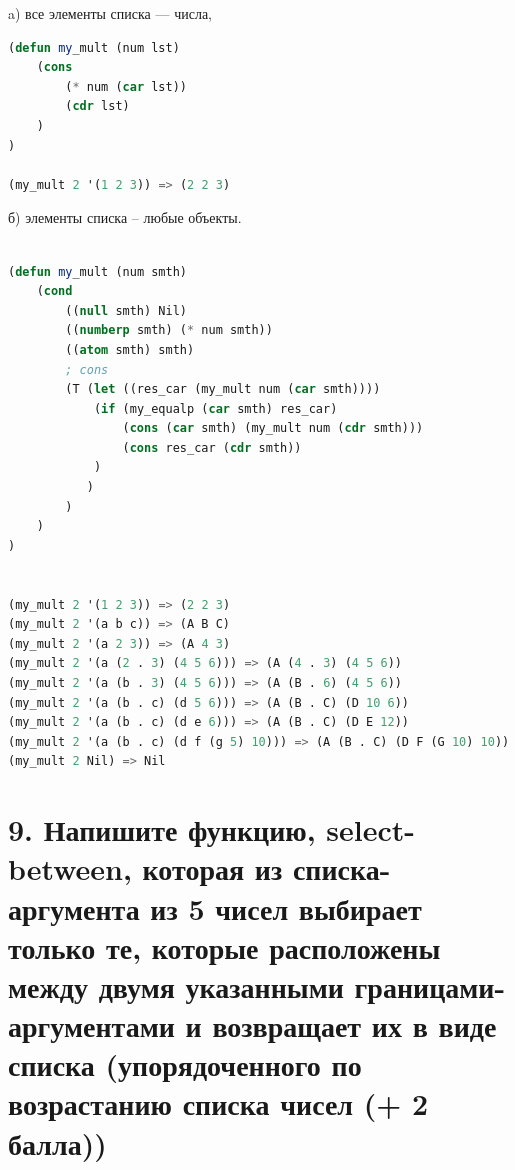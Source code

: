 \documentclass[12pt]{report}
\begin{document}
a) все элементы списка --- числа,

\begin{lstlisting}[language=Lisp]
(defun my_mult (num lst) 
	(cons 
		(* num (car lst)) 
		(cdr lst)
	)
)

(my_mult 2 '(1 2 3)) => (2 2 3)
\end{lstlisting}


б) элементы списка -- любые объекты.

\begin{lstlisting}[language=Lisp]

(defun my_mult (num smth)
	(cond 
		((null smth) Nil)
		((numberp smth) (* num smth))
		((atom smth) smth)
		; cons
		(T (let ((res_car (my_mult num (car smth))))
			(if (my_equalp (car smth) res_car)
				(cons (car smth) (my_mult num (cdr smth)))
				(cons res_car (cdr smth))
			)
		   )
		)
	)
)


(my_mult 2 '(1 2 3)) => (2 2 3)
(my_mult 2 '(a b c)) => (A B C)
(my_mult 2 '(a 2 3)) => (A 4 3)
(my_mult 2 '(a (2 . 3) (4 5 6))) => (A (4 . 3) (4 5 6))
(my_mult 2 '(a (b . 3) (4 5 6))) => (A (B . 6) (4 5 6))
(my_mult 2 '(a (b . c) (d 5 6))) => (A (B . C) (D 10 6))
(my_mult 2 '(a (b . c) (d e 6))) => (A (B . C) (D E 12))
(my_mult 2 '(a (b . c) (d f (g 5) 10))) => (A (B . C) (D F (G 10) 10))
(my_mult 2 Nil) => Nil
\end{lstlisting}

\section*{9. Напишите функцию, select-between, которая из списка-аргумента из 5 чисел выбирает только те, которые расположены между двумя указанными границами-аргументами и возвращает их в виде списка (упорядоченного по возрастанию списка чисел (+ 2 балла))}
\end{document}
